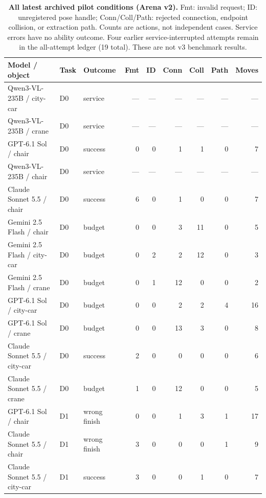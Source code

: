 \begin{table}[!ht]\centering\small
\caption{\textbf{All latest archived pilot conditions (Arena v2).} Fmt: invalid request; ID: unregistered pose handle; Conn/Coll/Path: rejected connection, endpoint collision, or extraction path. Counts are actions, not independent cases. Service errors have no ability outcome. Four earlier service-interrupted attempts remain in the all-attempt ledger (19 total). These are not v3 benchmark results.}
\label{tab:pilot-all}
\begin{tabularx}{\textwidth}{@{}Xllrrrrrr@{}}\toprule
Model / object & Task & Outcome & Fmt & ID & Conn & Coll & Path & Moves\\\midrule
Qwen3-VL-235B / city-car & D0 & service & --- & --- & --- & --- & --- & ---\\
Qwen3-VL-235B / crane & D0 & service & --- & --- & --- & --- & --- & ---\\
GPT-6.1 Sol / chair & D0 & success & 0 & 0 & 1 & 1 & 0 & 7\\
Qwen3-VL-235B / chair & D0 & service & --- & --- & --- & --- & --- & ---\\
Claude Sonnet 5.5 / chair & D0 & success & 6 & 0 & 1 & 0 & 0 & 7\\
Gemini 2.5 Flash / chair & D0 & budget & 0 & 0 & 3 & 11 & 0 & 5\\
Gemini 2.5 Flash / city-car & D0 & budget & 0 & 2 & 2 & 12 & 0 & 3\\
Gemini 2.5 Flash / crane & D0 & budget & 0 & 1 & 12 & 0 & 0 & 2\\
GPT-6.1 Sol / city-car & D0 & budget & 0 & 0 & 2 & 2 & 4 & 16\\
GPT-6.1 Sol / crane & D0 & budget & 0 & 0 & 13 & 3 & 0 & 8\\
Claude Sonnet 5.5 / city-car & D0 & success & 2 & 0 & 0 & 0 & 0 & 6\\
Claude Sonnet 5.5 / crane & D0 & budget & 1 & 0 & 12 & 0 & 0 & 5\\
GPT-6.1 Sol / chair & D1 & wrong finish & 0 & 0 & 1 & 3 & 1 & 17\\
Claude Sonnet 5.5 / chair & D1 & wrong finish & 3 & 0 & 0 & 0 & 1 & 9\\
Claude Sonnet 5.5 / city-car & D1 & success & 3 & 0 & 0 & 1 & 0 & 7\\
\bottomrule\end{tabularx}\end{table}
